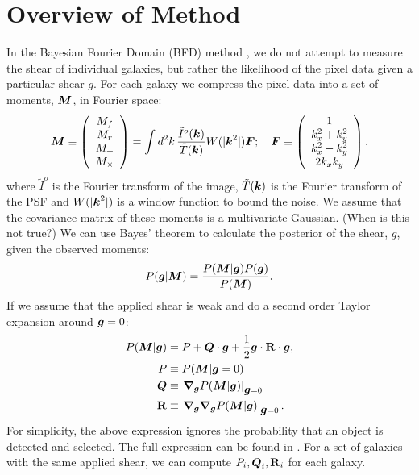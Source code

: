 \documentclass[useAMS,usenatbib]{mnras}
\newcommand{\vecM}{\mbox{\boldmath $M$}}
\newcommand{\vecg}{\mbox{\boldmath $g$}}
\newcommand{\veck}{\mbox{\boldmath $k$}}
\newcommand{\vecQ}{\mbox{\boldmath $Q$}}
\newcommand{\vecF}{\mbox{\boldmath $F$}}
\newcommand{\matR}{\mbox{$\bf R$}}
\newcommand{\bnabg}{\boldsymbol{\nabla_g}}
\begin{document}
\section{Overview of Method}
\label{Sec:Overview}

In the Bayesian Fourier Domain (BFD) method \citep{Bernstein2015,Bernstein2016}, we do not attempt to measure the shear of individual galaxies, but rather the likelihood of the pixel data given a particular shear \vecg.  For each galaxy we compress the pixel data into a set of moments, $\vecM$, in Fourier space:
\begin{equation}
\label{moments}
\vecM \equiv \left( \begin{array}{c}
M_f \\
M_r \\
M_+ \\
M_\times
\end{array}
\right) = \int d^2k\, \frac{\tilde I^o(\veck)}{\tilde T(\veck)}
W(|\veck^2|) \vecF; \quad \vecF \equiv
\left( \begin{array}{c}
1 \\
k_x^2 + k_y^2 \\
k_x^2 - k_y^2 \\
2 k_x k_y
\end{array}
\right).
\end{equation}
where  $\tilde I^o$ is the Fourier transform of the image, $\tilde T(\veck)$ is the Fourier transform of the PSF and  $W(|\veck^2|)$ is a window function to bound the noise.  We assume that the covariance matrix of these moments is a multivariate Gaussian.  (When is this not true?) We can use Bayes' theorem to calculate the posterior of the shear, \vecg,
given the observed moments:
\begin{equation}
P(\vecg | \vecM) = \frac{P(\vecM | \vecg) P(\vecg)}{P(\vecM)}.
\end{equation}
If we assume that the applied shear is weak and do a second order Taylor expansion around $\vecg=0$:
\begin{align}
P(\vecM | \vecg) & = P + \vecQ\cdot \vecg + \frac{1}{2} \vecg \cdot
\matR \cdot \vecg, \\
P & \equiv P(\vecM | \vecg=0)  \\ \label{q1eqn}
\vecQ & \equiv \left.\bnabg P(\vecM | \vecg)\right|_{\vecg=0} \\
\matR & \equiv \left. \bnabg \bnabg P(\vecM | \vecg)\right|_{\vecg=0}.
\end{align}
For simplicity, the above expression ignores the probability that an object is detected and selected.  The full expression can be found in \cite{Bernstein2016}.  For a set of galaxies with the same applied shear, we can compute $P_i, \vecQ_i, \matR_i$ for each galaxy.
\end{document}
